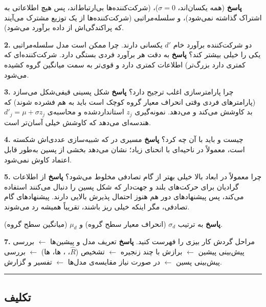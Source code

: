 \textbf{پاسخ}  (همه یکسان‌اند، \(\sigma = 0\))،
 (شرکت‌کننده‌ها بی‌ارتباط‌اند، پس هیچ اطلاعاتی به اشتراک
گذاشته نمی‌شود)، و سلسله‌مراتبی (شرکت‌کننده‌ها از یک
توزیع مشترک می‌آیند که پراکندگی‌اش از داده برآورد می‌شود).

\textbf{2.} دو شرکت‌کننده برآورد خام \(d'\) یکسانی دارند. چرا ممکن است
مدل سلسله‌مراتبی یکی را خیلی بیشتر  کند؟ \textbf{پاسخ}
 به دقت هر برآورد فردی بستگی دارد. شرکت‌کننده‌ای که
 کمتری دارد  بزرگ‌تر) اطلاعات کمتری دارد و قوی‌تر به سمت
میانگین گروه کشیده می‌شود.

\textbf{3.} چرا پارامترسازی  اغلب ترجیح دارد؟
\textbf{پاسخ} شکل  پسینی قیفی‌شکل می‌سازد (پارامترهای فردی
وقتی انحراف معیار گروه کوچک است باید به هم فشرده شوند) که  بد
کاوشش می‌کند و  می‌دهد. نمونه‌گیری \(z_j\) استانداردشده و
محاسبه‌ی \(d'_j = \mu + \sigma z_j\) هندسه‌ای می‌دهد که کاوشش خیلی آسان‌تر
است.

\textbf{4.}  چیست و باید با آن چه کرد؟ \textbf{پاسخ}
مسیری در  که شبیه‌سازی عددی‌اش شکسته است، معمولاً در ناحیه‌ای با
انحنای زیاد؛ نشان می‌دهد بخشی از پسین به‌طور قابل اعتماد کاوش نمی‌شود.

\textbf{5.} چرا  معمولاً در ابعاد بالا خیلی بهتر از
 گام تصادفی مخلوط می‌شود؟ \textbf{پاسخ} از اطلاعات گرادیان
برای حرکت‌های بلند و جهت‌دار که شکل پسین را دنبال می‌کنند استفاده می‌کند، پس
پیشنهادهای دور هم هنوز احتمال پذیرش بالایی دارند. پیشنهادهای گام تصادفی،
مگر اینکه خیلی ریز باشند، تقریباً همیشه رد می‌شوند.

\textbf{پاسخ} به ترتیب \(\sigma_d\) (انحراف معیار سطح گروه) و \(\mu_d\)
(میانگین سطح گروه).

\textbf{7.} مراحل گردش کار بیزی را فهرست کنید. \textbf{پاسخ} تعریف مدل و
پیشین‌ها \ensuremath{\leftarrow} بررسی پیش‌بینی پیشین \ensuremath{\leftarrow} برازش با چند زنجیره \ensuremath{\leftarrow} تشخیص (\(\hat R\)،
، ها، ها) \ensuremath{\leftarrow} بررسی پیش‌بینی پسین \ensuremath{\leftarrow} در
صورت نیاز مقایسه‌ی مدل‌ها \ensuremath{\leftarrow} تفسیر و گزارش.

\begin{center}\rule{0.5\linewidth}{0.5pt}\end{center}

\subsection{تکلیف}


